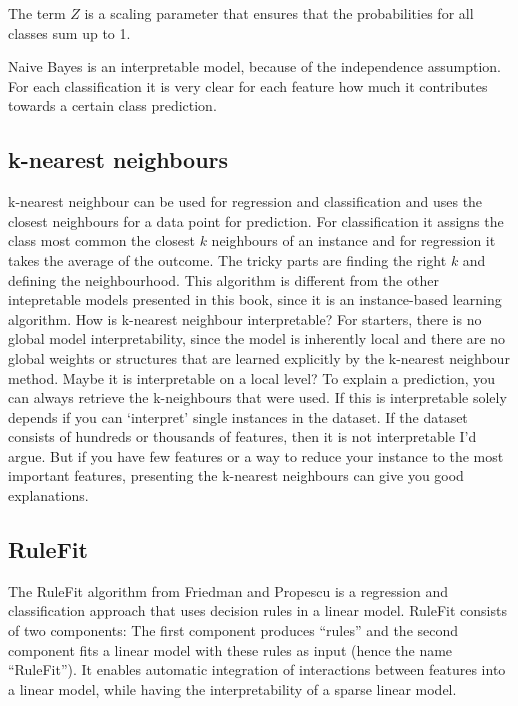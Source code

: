 \documentclass[12pt,]{krantz}
\theoremstyle{definition}
\theoremstyle{definition}
\theoremstyle{definition}
\theoremstyle{remark}
\begin{document}
The term \(Z\) is a scaling parameter that ensures that the
probabilities for all classes sum up to 1.

Naive Bayes is an interpretable model, because of the independence
assumption. For each classification it is very clear for each feature
how much it contributes towards a certain class prediction.

\subsection{k-nearest neighbours}\label{k-nearest-neighbours}

k-nearest neighbour can be used for regression and classification and
uses the closest neighbours for a data point for prediction. For
classification it assigns the class most common the closest \(k\)
neighbours of an instance and for regression it takes the average of the
outcome. The tricky parts are finding the right \(k\) and defining the
neighbourhood. This algorithm is different from the other intepretable
models presented in this book, since it is an instance-based learning
algorithm. How is k-nearest neighbour interpretable? For starters, there
is no global model interpretability, since the model is inherently local
and there are no global weights or structures that are learned
explicitly by the k-nearest neighbour method. Maybe it is interpretable
on a local level? To explain a prediction, you can always retrieve the
k-neighbours that were used. If this is interpretable solely depends if
you can `interpret' single instances in the dataset. If the dataset
consists of hundreds or thousands of features, then it is not
interpretable I'd argue. But if you have few features or a way to reduce
your instance to the most important features, presenting the k-nearest
neighbours can give you good explanations.

\subsection{RuleFit}\label{rulefit}

The RuleFit algorithm from Friedman and Propescu
\citep{friedman2008predictive} is a regression and classification
approach that uses decision rules in a linear model. RuleFit consists of
two components: The first component produces ``rules'' and the second
component fits a linear model with these rules as input (hence the name
``RuleFit''). It enables automatic integration of interactions between
features into a linear model, while having the interpretability of a
sparse linear model.
\end{document}
